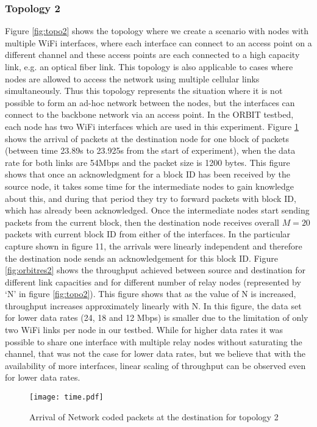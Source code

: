 \documentclass{sig-alternate-10pt}
\begin{document}
\subsubsection{Topology 2}
Figure \ref{fig:topo2} shows the topology where we create a scenario with nodes with multiple WiFi interfaces, where each interface can connect to an access point on a different channel and these access points are each connected to a high capacity link, e.g. an optical fiber link. This topology is also applicable to cases where nodes are allowed to access the network using multiple cellular links simultaneously. Thus this topology represents the situation where it is not possible to form an ad-hoc network between the nodes, but the interfaces can connect to the backbone network via an access point. In the ORBIT testbed, each node has two WiFi interfaces which are used in this experiment. Figure \ref{fig:time} shows the arrival of packets at the destination node for one block of packets (between time 23.89s to 23.925s from the start of experiment), when the data rate for both links are 54Mbps and the packet size is 1200 bytes. This figure shows that once an acknowledgment for a block ID has been received by the source node, it takes some time for the intermediate nodes to gain knowledge about this, and during that period they try to forward packets with  block ID, which has already been acknowledged. Once the intermediate nodes start sending  packets from the current block, then the destination node receives overall $M=20$ packets with current block ID from either of the interfaces. In the particular capture shown in figure 11, the arrivals were linearly independent and therefore the destination node sends an acknowledgement for this block ID. Figure \ref{fig:orbitres2} shows the throughput achieved between  source and  destination for different link capacities and for different number of relay nodes (represented by `N' in figure \ref{fig:topo2}). This figure shows that as the value of N is increased, throughput  increases approximately linearly with N. In this figure, the data set for lower data rates (24, 18 and 12 Mbps) is smaller due to the limitation of only two WiFi links per node in our testbed. While for higher data rates it was possible to share one interface with multiple relay nodes without saturating the channel, that was not the case for lower data rates, but we believe that with the availability of more interfaces, linear scaling of throughput can be observed even for lower data rates. 

\begin{figure}[t]
\texttt{[image: time.pdf]}
\caption{Arrival of Network coded packets at the destination for topology 2}
\label{fig:time}
\end{figure}
\end{document}

